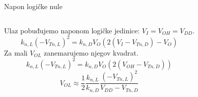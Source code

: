 \begin{frame}[label=09_2-s008]{Napon logičke nule}
\begin{columns}[T,onlytextwidth]\centering {}Ulaz pobuđujemo naponom logičke jedinice: $V_I=V_{OH}=V_{DD}$.
\[k_{n,L}(-V_{Tn,L})^2=k_{n,D}V_O\left(2(V_I-V_{Tn,D})-V_O\right)\]
Za mali $V_{OL}$ zanemarujemo njegov kvadrat.
\[k_{n,L}(-V_{Tn,L})^2=k_{n,D}V_O\left(2(V_{OH}-V_{Tn,D})\right)\]
\[V_{OL}\approx\frac12\frac{k_{n,L}}{k_{n,D}}\frac{(-V_{Tn,L})^2}{V_{DD}-V_{Tn,D}}\]
\end{columns}
\end{frame}

